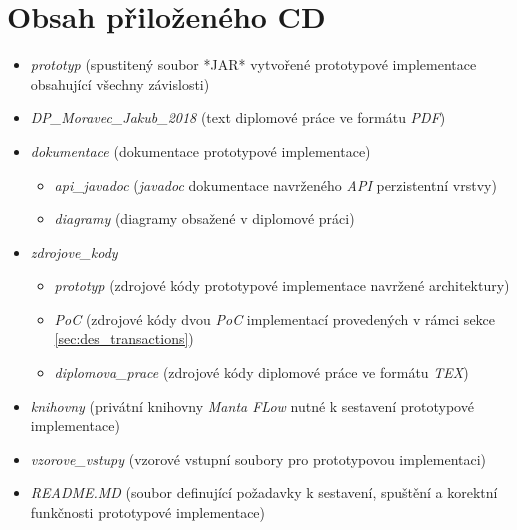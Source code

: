 \documentclass[11pt,twoside,a4paper]{book}
\begin{document}
\chapter{Obsah přiloženého CD}
\label{apx:cd}

\begin{itemize}
   \item{\textit{prototyp}} (spustitený soubor *JAR* vytvořené prototypové implementace obsahující všechny závislosti)
   \item{\textit{DP\_Moravec\_Jakub\_2018}} (text diplomové práce ve formátu \textit{PDF})
   \item{\textit{dokumentace}} (dokumentace prototypové implementace)
      \begin{itemize}
         \item{\textit{api\_javadoc}} (\textit{javadoc} dokumentace navrženého \textit{API} perzistentní vrstvy)
         \item{\textit{diagramy}} (diagramy obsažené v diplomové práci)
      \end{itemize}
   \item{\textit{zdrojove\_kody}}
      \begin{itemize}
         \item{\textit{prototyp}} (zdrojové kódy prototypové implementace navržené architektury)
         \item{\textit{PoC}} (zdrojové kódy dvou \textit{PoC} implementací provedených v rámci sekce \ref{sec:des_transactions})
         \item{\textit{diplomova\_prace}} (zdrojové kódy diplomové práce ve formátu \textit{TEX})
      \end{itemize}
   \item{\textit{knihovny}} (privátní knihovny \textit{Manta FLow} nutné k sestavení prototypové implementace)
   \item{\textit{vzorove\_vstupy}} (vzorové vstupní soubory pro prototypovou implementaci)
   \item{\textit{README.MD}} (soubor definující požadavky k sestavení, spuštění a korektní funkčnosti prototypové implementace)
\end{itemize}
\end{document}
